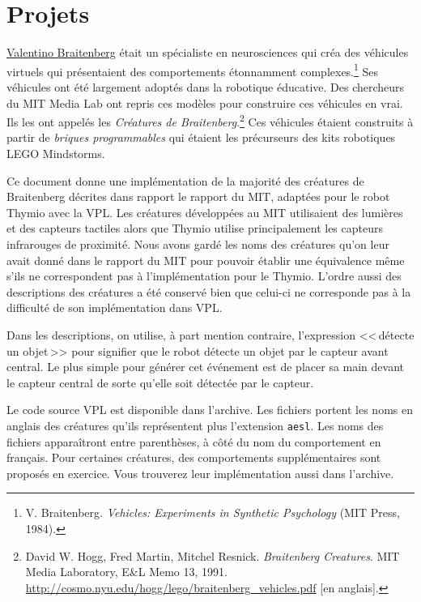 \part{Projets}

\label{ch.brait}


\href{http://fr.wikipedia.org/wiki/Valentino_Braitenberg}{Valentino Braitenberg}
était un spécialiste en neurosciences qui créa des véhicules virtuels
qui présentaient des comportements étonnamment complexes.\footnote{V. Braitenberg.
\textit{Vehicles: Experiments in Synthetic Psychology} (MIT Press, 1984).}
Ses véhicules ont été largement adoptés dans la robotique éducative.
Des chercheurs du MIT Media Lab ont repris ces modèles pour construire ces véhicules en vrai.
Ils les ont appelés les \emph{Créatures de Braitenberg}.\footnote{David W. Hogg, Fred Martin,
Mitchel Resnick. \textit{Braitenberg Creatures}. MIT Media Laboratory, E\&L Memo 13, 1991.
\href{http://cosmo.nyu.edu/hogg/lego/braitenberg_vehicles.pdf}{http://cosmo.nyu.edu/hogg/lego/braitenberg\_vehicles.pdf} [en anglais].}
Ces véhicules étaient construits à partir de \emph{briques programmables} qui étaient les
précurseurs des kits robotiques LEGO Mindstorms.

Ce document donne une implémentation de la majorité des créatures de Braitenberg décrites dans
rapport le rapport du MIT, adaptées pour le robot Thymio avec la VPL.
Les créatures développées au MIT utilisaient des lumières et des capteurs tactiles
alors que Thymio utilise principalement les capteurs infrarouges de proximité.
Nous avons gardé les noms des créatures
qu'on leur avait donné dans le rapport du MIT pour pouvoir établir une équivalence même s'ils ne correspondent pas à l'implémentation pour le Thymio.
L'ordre aussi des descriptions des créatures a été conservé
bien que celui-ci ne corresponde pas à la difficulté de son implémentation dans VPL.

Dans les descriptions, on utilise, à part mention contraire,
l'expression <<\,détecte un objet\,>> pour signifier
que le robot détecte un objet par le capteur avant central.
Le plus simple pour générer cet événement est de placer sa main
devant le capteur central
de sorte qu'elle soit détectée par le capteur.

Le code source VPL est disponible dans l'archive.
Les fichiers portent les noms en anglais des créatures qu'ils représentent
plus l'extension \texttt{\small aesl}.
Les noms des fichiers apparaîtront entre parenthèses, à côté du nom du comportement en français.
Pour certaines créatures, des comportements supplémentaires sont proposés en exercice.
Vous trouverez leur implémentation aussi dans l'archive.

